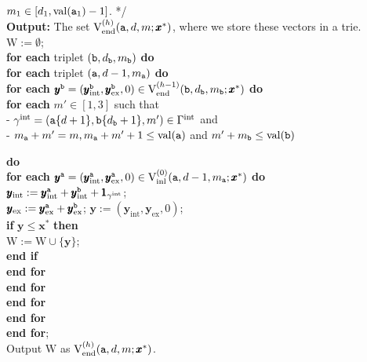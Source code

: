 \documentclass[12pt]{article}
\newcommand{\intt}{\mathrm{int}}
\newcommand{\ex}{\mathrm{ex}}
\newcommand{\V}{{\rm V}}
\newcommand{\ta}{{\tt a}}
\newcommand{\tb}{{\tt b}}
\newcommand{\y}{\pmb{y}}
\newcommand{\x}{\pmb{x}}
\newcommand{\1}{\pmb{1}}
\newcommand{\0}{\pmb{0}}
\newcommand{\val}{\mathrm{val}}
\newcommand{\inl}{\mathrm{inl}}
\newcommand{\en}{\mathrm{end}}
\newcommand{\W}{\mathrm{W}}
\begin{document}
\begin{tabbing}
                  $m_1 \in [d_1, \val(\ta_1) - 1]$. */ \- \\
{\bf Output:} The set $\V_{\en}^{(h)}(\ta, d, m; \x^*)$, where 
we store these vectors in a trie. \\
$\W := \emptyset$; \\
{\bf for each} triplet  $(\tb, d_{\tb}, m_{\tb})$ {\bf do} \+ \\
    {\bf for each} triplet $(\ta, d-1, m_{\ta})$ {\bf do} \+ \\
    {\bf for each} $\y^{\tb} = (\y^{\tb}_{\intt}, 
    \y^{\tb}_{\ex}, 0) \in 
    \V_{\en}^{(h-1)}(\tb, d_{\tb}, m_{\tb}; \x^*)$
                         {\bf do} \+ \\
            {\bf for each} $m' \in [1, 3]$ such that \+ \+ \\ 
                      - $\gamma^{\intt} = (\ta \{d+1\}, \tb  \{d_{\tb} + 1\},
                       m') \in \Gamma^{\intt}$ and\\
                      - $m_{\ta} + m' = m, 
                      m_{\ta} + m' + 1\leq \val(\ta)$ and 
                      $m' +m_{\tb} \leq \val(\tb)$
                      
                       {\bf do} \- \\
                      {\bf for each} $\y^{\ta} = (\y^{\ta}_{\intt}, \y^{\ta}_{\ex}, 0) \in 
                      \V_{\inl}^{(0)}(\ta, d-1,m_{\ta}; \x^*)$ 
                      {\bf do} \+\\                      
                     $\y_{\intt} := \y^{\ta}_{\intt} + \y^{\tb}_{\intt} + \1_{\gamma^{\intt}}$;  \\
                     $\y_{\ex} := \y^{\ta}_{\ex} + \y^{\tb}_{\ex}$;  
                     $\y:=(\y_{\intt}, \y_{\ex}, 0)$;\\
                     {\bf if } $\y \leq \x^*$ {\bf then} \+ \\  
                                          $\W := \W \cup \{ \y \}$; \- \\              
                      {\bf end if} \- \\
                 {\bf end for} \- \\
            {\bf end for} \- \\
        {\bf end for} \- \\
    {\bf end for} \- \\
{\bf end for}; \\
Output $\W$ as $\V_{\en}^{(h)}(\ta, d, m; \x^*)$.
\end{tabbing}
\end{document}
